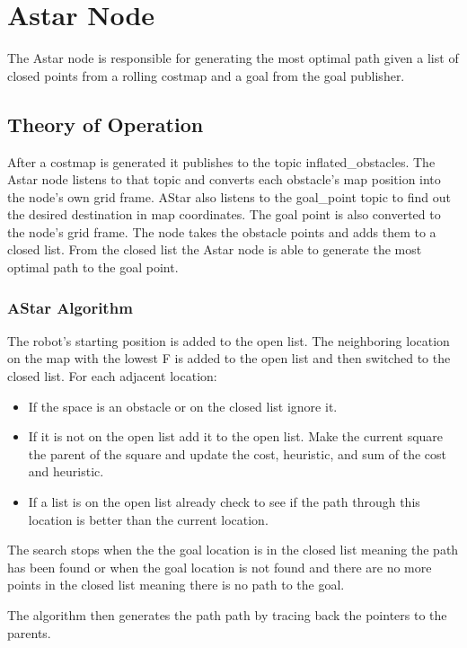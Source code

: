\section{Astar Node}

The Astar node is responsible for generating the most optimal path given a list of closed points from a rolling costmap and a goal from the goal publisher.

\subsection{Theory of Operation}
After a costmap is generated it publishes to the topic inflated\_obstacles. The Astar node listens to that topic and converts each obstacle's map position into the node's own grid frame. AStar also listens to the goal\_point topic to find out the desired destination in map coordinates. The goal point is also converted to the node's grid frame. The node takes the obstacle points and adds them to a closed list. From the closed list the Astar node is able to generate the most optimal path to the goal point.


\subsubsection{AStar Algorithm}
The robot's starting position is added to the open list. The neighboring location on the map with the lowest F is added to the open list and then switched to the closed list. For each adjacent location:

\begin{itemize} 
\item If the space is an obstacle or on the closed list ignore it.
\item If it is not on the open list add it to the open list. Make the current square the parent of the square and update the cost, heuristic, and sum of the cost and heuristic.
\item If a list is on the open list already check to see if the path through this location is better than the current location.
\end{itemize}

The search stops when the the goal location is in the closed list meaning the path has been found or when the goal location is not found and there are no more points in the closed list meaning there is no path to the goal.

The algorithm then generates the path path by tracing back the pointers to the parents.

